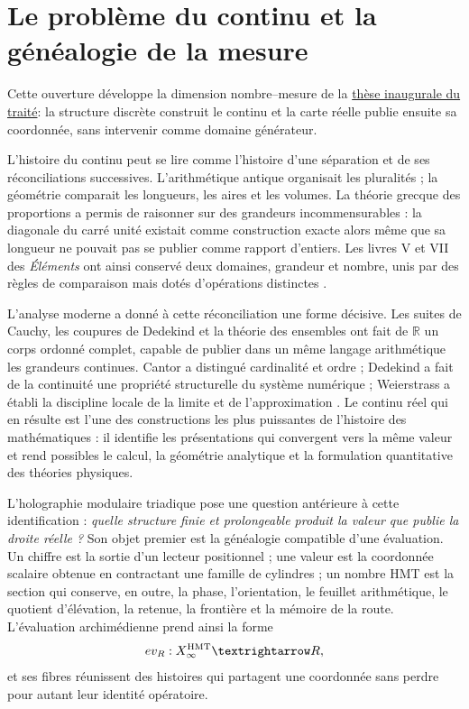
\section{Le problème du continu et la généalogie de la mesure}
\label{sec:continuo-numero-medida-hmt-revfinal}

Cette ouverture développe la dimension nombre--mesure de la
\hyperref[sec:tesis-inaugural-helicoidal-hmt-md]{thèse inaugurale du traité}:
la structure discrète construit le continu et la carte réelle publie ensuite
sa coordonnée, sans intervenir comme domaine générateur.

L'histoire du continu peut se lire comme l'histoire d'une séparation et
de ses réconciliations successives. L'arithmétique antique organisait les
pluralités ; la géométrie comparait les longueurs, les aires et les volumes. La théorie
grecque des proportions a permis de raisonner sur des grandeurs incommensurables :
la diagonale du carré unité existait comme construction exacte alors même que
sa longueur ne pouvait pas se publier comme rapport d'entiers. Les livres V et VII
des \emph{Éléments} ont ainsi conservé deux domaines, grandeur et nombre,
unis par des règles de comparaison mais dotés d'opérations distinctes
\cite{EuclidElements,SEPAristotleMath}.

L'analyse moderne a donné à cette réconciliation une forme décisive. Les
suites de Cauchy, les coupures de Dedekind et la théorie des ensembles ont fait
de \(\mathbb R\) un corps ordonné complet, capable de publier dans un même
langage arithmétique les grandeurs continues. Cantor a distingué cardinalité
et ordre ; Dedekind a fait de la continuité une propriété structurelle du
système numérique ; Weierstrass a établi la discipline locale de la limite et de
l'approximation \cite{SEPDedekind,SEPContinuity,SEPSetTheory}. Le continu réel
qui en résulte est l'une des constructions les plus puissantes de l'histoire des
mathématiques : il identifie les présentations qui convergent vers la même valeur et rend
possibles le calcul, la géométrie analytique et la formulation quantitative des
théories physiques.

L'holographie modulaire triadique pose une question antérieure à cette
identification : \emph{quelle structure finie et prolongeable produit la valeur
que publie la droite réelle ?} Son objet premier est la généalogie compatible d'une
évaluation. Un chiffre est la sortie d'un lecteur positionnel ; une valeur est
la coordonnée scalaire obtenue en contractant une famille de cylindres ; un nombre
HMT est la section qui conserve, en outre, la phase, l'orientation, le feuillet
arithmétique, le quotient d'élévation, la retenue, la frontière et la mémoire de
la route. L'évaluation archimédienne prend ainsi la forme
\[
 \operatorname{ev}_{\mathbb R}:X_\infty^{\rm HMT}\longrightarrow\mathbb R,
\]
et ses fibres réunissent des histoires qui partagent une coordonnée sans perdre pour autant
leur identité opératoire.

